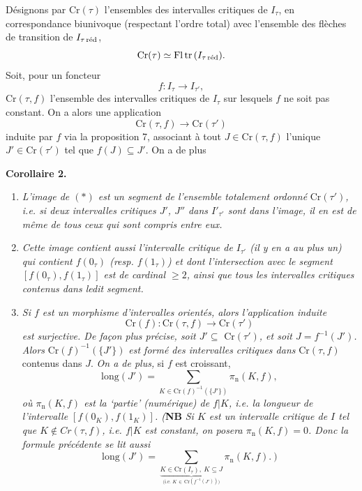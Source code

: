 \documentclass[11pt]{article}
\newcommand{\msp}[1]{\marginpar{\footnotesize [#1]}}
\newcommand{\red}{\text{\upshape réd}}
\begin{document}
Désignons par $\mathrm{Cr}(\tau)$ l'ensembles des intervalles critiques de $I_\tau$, en correspondance biunivoque (respectant l'ordre total) avec l'ensemble des flèches de transition de $I_{\tau\,\red}$, %
\[
\mathrm{Cr}(\tau)\simeq\mathrm{Fl}\,\mathrm{tr}\,(I_{\tau\,\red}).
\]
Soit, pour un foncteur
\[
f : I_\tau\longrightarrow I_{\tau'},
\]
$\mathrm{Cr}(\tau,f)$ l'ensemble des intervalles critiques de $I_\tau$ sur lesquels $f$ ne soit pas constant. On a alors une application
\[
\mathrm{Cr}(\tau,f)\longrightarrow\mathrm{Cr}(\tau') \tag*{$(*)$} %
\]
induite par $f$ via la proposition 7, associant à tout $J\in\mathrm{Cr}(\tau,f)$ l'unique $J'\in\mathrm{Cr}(\tau')$ tel que $f(J)\subseteq J'$. On a de plus

\textbf{Corollaire 2.}
\begin{enumerate}
\item[\textit{a)}] \textit{L'image de $(*)$ est un segment de l'ensemble totalement ordonné} $\mathrm{Cr}(\tau')$\textit{, i.e. si deux intervalles critiques $J'$, $J''$ dans $I'_{\tau'}$ sont dans l'image, il en est de même de tous} %
\msp{page 36}
\textit{ceux qui sont compris entre eux.}
\item[\textit{b)}] \textit{Cette image contient aussi l'intervalle critique de $I_{\tau'}$ (il y en a au plus un) qui contient $f(0_\tau)$ (resp. $f(1_\tau)$) et dont l'intersection avec le segment $[f(0_\tau),f(1_\tau)]$ est de cardinal $\geq 2$, ainsi que tous les intervalles critiques contenus dans ledit segment.}
\item[\textit{c)}] \textit{Si $f$ est un morphisme d'intervalles orientés, alors l'application induite}
\[
\mathrm{Cr}(f):\mathrm{Cr}(\tau,f)\longrightarrow\mathrm{Cr}(\tau')
\]
\textit{est surjective. De façon plus précise, soit $J'\subseteq$} $\mathrm{Cr}(\tau')$\textit{, et soit $J=f^{-1}(J')$. Alors} $\mathrm{Cr}(f)^{-1}(\{J'\})$ \textit{est formé des intervalles critiques dans} $\mathrm{Cr}(\tau,f)$ contenus dans $J$. \textit{On a de plus,} si $f$ est croissant, %
\[
\mathrm{long}(J')=\sum_{K\in\mathrm{Cr}(f)^{-1}(\{J'\})}\pi_{\mathrm{n}}(K,f),
\]
\textit{où $\pi_{\mathrm{n}}(K,f)$ est la `partie' (numérique) de $f|K$, i.e. la longueur de l'intervalle $[f(0_K),f(1_K)]$. (}\textbf{NB} \textit{Si $K$ est un intervalle critique de $I$ tel que $K\notin Cr(\tau,f)$, i.e. $f|K$ est constant, on posera $\pi_{\mathrm{n}}(K,f)=0$. Donc la formule précédente se lit aussi}
\[
\mathrm{long}(J')=\sum\limits_{\underbrace{K\in\mathrm{Cr}(I_\tau),\ K\subseteq J}_{\text{(i.e. }K\,\in\,\mathrm{Cr}(f^{-1}(J'))\text{)}}}\pi_{\mathrm{n}}(K,f).\ \textit{)}
\]
\end{enumerate}
\end{document}

